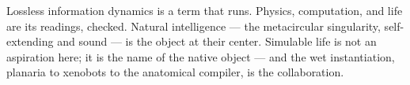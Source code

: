 \documentclass[11pt]{article}
\begin{document}
Lossless information dynamics is a term that runs. Physics, computation, and
life are its readings, checked. Natural intelligence --- the metacircular
singularity, self-extending and sound --- is the object at their center.
Simulable life is not an aspiration here; it is the name of the native object ---
and the wet instantiation, planaria to xenobots to the anatomical compiler, is
the collaboration.
\end{document}
